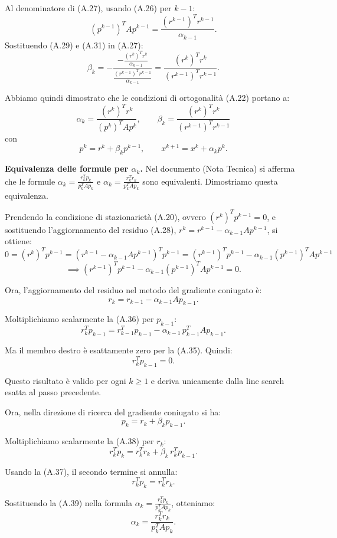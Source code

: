 \documentclass[a4paper,12pt]{article}
\numberwithin{equation}{section}
\numberwithin{figure}{section}
\numberwithin{table}{section}
\begin{document}
Al denominatore di (A.27), usando (A.26) per \(k-1\):
\[
(p^{k-1})^T A p^{k-1}=\frac{(r^{k-1})^T r^{k-1}}{\alpha_{k-1}}. \tag{A.31}
\]
Sostituendo (A.29) e (A.31) in (A.27):
\[
\beta_k
= -\frac{-\frac{(r^k)^T r^k}{\alpha_{k-1}}}{\frac{(r^{k-1})^T r^{k-1}}{\alpha_{k-1}}}
= \frac{(r^k)^T r^k}{(r^{k-1})^T r^{k-1}}. \tag{A.32}
\]

Abbiamo quindi dimostrato che le condizioni di ortogonalità (A.22) portano a:
\[
\alpha_k=\frac{(r^k)^T r^k}{(p^k)^T A p^k},\qquad
\beta_k=\frac{(r^k)^T r^k}{(r^{k-1})^T r^{k-1}}
\tag{A.33}
\]
con
\[
p^k=r^k+\beta_k p^{k-1},\qquad x^{k+1}=x^k+\alpha_k p^k. \tag{A.34}
\]

\medskip
\noindent
\textbf{Equivalenza delle formule per $\alpha_k$.}
Nel documento (Nota Tecnica) si afferma che le formule $\alpha_k = \frac{r_k^T p_k}{p_k^T A p_k}$ e $\alpha_k = \frac{r_k^T r_k}{p_k^T A p_k}$ sono equivalenti. Dimostriamo questa equivalenza.

Prendendo la condizione di stazionarietà (A.20), ovvero $(r^k)^T p^{k-1} = 0$, e sostituendo l'aggiornamento del residuo (A.28), $r^k = r^{k-1} - \alpha_{k-1} A p^{k-1}$, si ottiene:
\[
0 = (r^k)^T p^{k-1} = (r^{k-1} - \alpha_{k-1} A p^{k-1})^T p^{k-1}
= (r^{k-1})^T p^{k-1} - \alpha_{k-1} (p^{k-1})^T A p^{k-1}\]\[\implies
(r^{k-1})^T p^{k-1} - \alpha_{k-1} (p^{k-1})^T A p^{k-1} = 0. \tag{A.35}
\]

Ora, l'aggiornamento del residuo nel metodo del gradiente coniugato è:
\[
r_k = r_{k-1} - \alpha_{k-1} A p_{k-1}. \tag{A.36}
\]

Moltiplichiamo scalarmente la (A.36) per $p_{k-1}$:
\[
r_k^T p_{k-1} = r_{k-1}^T p_{k-1} - \alpha_{k-1} \, p_{k-1}^T A p_{k-1}.
\]

Ma il membro destro è esattamente zero per la (A.35). Quindi:
\[
r_k^T p_{k-1} = 0. \tag{A.37}
\]

Questo risultato è valido per ogni $k \ge 1$ e deriva unicamente dalla line search esatta al passo precedente.

Ora, nella direzione di ricerca del gradiente coniugato si ha:
\[
p_k = r_k + \beta_k p_{k-1}. \tag{A.38}
\]

Moltiplichiamo scalarmente la (A.38) per $r_k$:
\[
r_k^T p_k = r_k^T r_k + \beta_k \, r_k^T p_{k-1}.
\]

Usando la (A.37), il secondo termine si annulla:
\[
r_k^T p_k = r_k^T r_k. \tag{A.39}
\]

Sostituendo la (A.39) nella formula $\alpha_k = \frac{r_k^T p_k}{p_k^T A p_k}$, otteniamo:
\[
\alpha_k = \frac{r_k^T r_k}{p_k^T A p_k}. \tag{A.40}
\]
\end{document}

